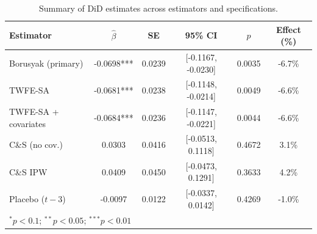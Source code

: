 \begin{table}[t]
\centering
\caption{Summary of DiD estimates across estimators and specifications.}
\label{tab:combined}
\small
\begin{tabular}{lccccc}
\toprule
Estimator & $\hat{\beta}$ & SE & 95\% CI & $p$ & Effect (\%) \\
\midrule
Borusyak (primary) & -0.0698*** & 0.0239 & [-0.1167, -0.0230] & 0.0035 & -6.7\% \\
TWFE-SA & -0.0681*** & 0.0238 & [-0.1148, -0.0214] & 0.0049 & -6.6\% \\
TWFE-SA + covariates & -0.0684*** & 0.0236 & [-0.1147, -0.0221] & 0.0044 & -6.6\% \\
C\&S (no cov.) & 0.0303 & 0.0416 & [-0.0513, 0.1118] & 0.4672 & 3.1\% \\
C\&S IPW & 0.0409 & 0.0450 & [-0.0473, 0.1291] & 0.3633 & 4.2\% \\
Placebo ($t-3$) & -0.0097 & 0.0122 & [-0.0337, 0.0142] & 0.4269 & -1.0\% \\
\bottomrule
\multicolumn{6}{l}{\footnotesize $^{*}p<0.1$; $^{**}p<0.05$; $^{***}p<0.01$} \\
\end{tabular}
\end{table}
